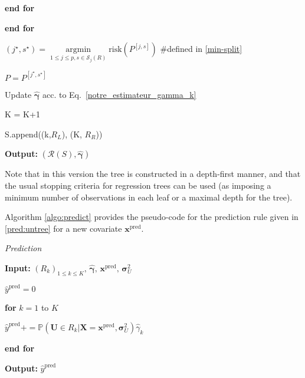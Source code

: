 \begin{algorithm}
             \hspace{\parindent} \textbf{end for}
            
             \textbf{end for}
            
            $(j^\star, s^\star)=\underset{1\leq j \leq p, s \in \mathcal{S}_j(R)}{\operatorname{argmin}} \text{risk}(P^{[j,s]})$ \#defined in \eqref{min-split}
            
            $P = P^{[j^\star, s^\star]}$
        
            Update $\hat{\boldsymbol{\gamma}}$ acc. to Eq.~\ref{notre_estimateur_gamma_k}
            
            K = K+1
            
            S.append((k,$R_L$), (K, $R_R$))
            
            
            
    \noindent \textbf{Output:} $(\mathcal{R}(S),\hat{\boldsymbol{\gamma}})$
    \label{algo:buid_tree}

\end{algorithm}

Note that in this version the tree is constructed in a depth-first manner, and that the usual stopping criteria for regression trees can be used (as imposing a minimum number of observations in each leaf or a maximal depth for the tree).

Algorithm \ref{algo:predict} provides the pseudo-code for the prediction rule given in  \eqref{pred:untree} for a new covariate $\boldsymbol{x}^\text{pred}$. 

\begin{algorithm}{\textit{Prediction}}

    \noindent \textbf{Input:}  $(R_{k})_{1 \le k \le K}, \, \hat{\boldsymbol{\gamma}}, \, \boldsymbol{x}^{\text{pred}}, \, {\boldsymbol{\sigma}}_U^2 $
    

    
    \noindent $\hat{y}^{\text{pred}} = 0 $
    
    \noindent \textbf{for} $k=1$ to $K$  
    
    $\hat{y}^{\text{pred}} +=  \mathbb{P}(\mathbf{U} \in R_k | \mathbf{X} = \boldsymbol{x}^{\text{pred}}, {\boldsymbol{\sigma}}_U^2) \hat{\gamma}_k$
    

    
 \noindent \textbf{end for}
            
    \noindent \textbf{Output:} $\hat{y}^{\text{pred}}$ 
    \label{algo:predict}

\end{algorithm}
